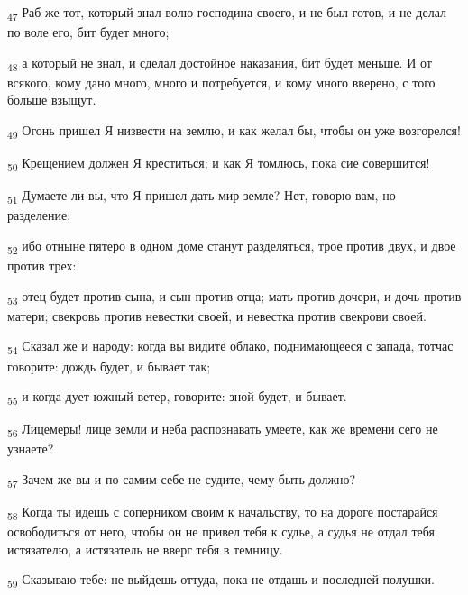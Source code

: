 \begin{tcolorbox}
\textsubscript{47} Раб же тот, который знал волю господина своего, и не был готов, и не делал по воле его, бит будет много;
\end{tcolorbox}
\begin{tcolorbox}
\textsubscript{48} а который не знал, и сделал достойное наказания, бит будет меньше. И от всякого, кому дано много, много и потребуется, и кому много вверено, с того больше взыщут.
\end{tcolorbox}
\begin{tcolorbox}
\textsubscript{49} Огонь пришел Я низвести на землю, и как желал бы, чтобы он уже возгорелся!
\end{tcolorbox}
\begin{tcolorbox}
\textsubscript{50} Крещением должен Я креститься; и как Я томлюсь, пока сие совершится!
\end{tcolorbox}
\begin{tcolorbox}
\textsubscript{51} Думаете ли вы, что Я пришел дать мир земле? Нет, говорю вам, но разделение;
\end{tcolorbox}
\begin{tcolorbox}
\textsubscript{52} ибо отныне пятеро в одном доме станут разделяться, трое против двух, и двое против трех:
\end{tcolorbox}
\begin{tcolorbox}
\textsubscript{53} отец будет против сына, и сын против отца; мать против дочери, и дочь против матери; свекровь против невестки своей, и невестка против свекрови своей.
\end{tcolorbox}
\begin{tcolorbox}
\textsubscript{54} Сказал же и народу: когда вы видите облако, поднимающееся с запада, тотчас говорите: дождь будет, и бывает так;
\end{tcolorbox}
\begin{tcolorbox}
\textsubscript{55} и когда дует южный ветер, говорите: зной будет, и бывает.
\end{tcolorbox}
\begin{tcolorbox}
\textsubscript{56} Лицемеры! лице земли и неба распознавать умеете, как же времени сего не узнаете?
\end{tcolorbox}
\begin{tcolorbox}
\textsubscript{57} Зачем же вы и по самим себе не судите, чему быть должно?
\end{tcolorbox}
\begin{tcolorbox}
\textsubscript{58} Когда ты идешь с соперником своим к начальству, то на дороге постарайся освободиться от него, чтобы он не привел тебя к судье, а судья не отдал тебя истязателю, а истязатель не вверг тебя в темницу.
\end{tcolorbox}
\begin{tcolorbox}
\textsubscript{59} Сказываю тебе: не выйдешь оттуда, пока не отдашь и последней полушки.
\end{tcolorbox}
